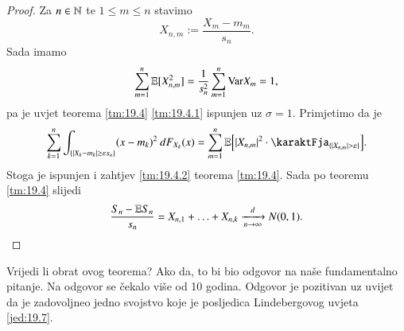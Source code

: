 \begin{proof}
    Za $n \in \mathbb{N}$ te $1 \leq m \leq n$ stavimo
    \begin{equation*}
        X_{n, m} := \frac{X_m - m_m}{s_n}.
    \end{equation*}
    Sada imamo
    \begin{equation*}
        \sum\limits_{m = 1}^{n} \mathbb{E} [X_{n, m}^2] = \frac{1}{s_n^2} \sum\limits_{m = 1}^{n} \mathrm{Var} X_m = 1,
    \end{equation*}
    pa je uvjet teorema \ref{tm:19.4} \ref{tm:19.4.1} ispunjen uz $\sigma = 1$.
    Primjetimo da je
    \begin{equation*}
        \suma{k = 1}{n} \int_{\{|X_k - m_k| \geq \varepsilon s_n\}} (x - m_k)^2 \: d F_{X_k} (x) = \suma{m = 1}{n} \masE \Big[ |X_{n, m}|^2 \cdot \karaktFja_{\{ |X_{n, m}| > \varepsilon \}} \Big].
    \end{equation*}
    Stoga je ispunjen i zahtjev \ref{tm:19.4.2} teorema \ref{tm:19.4}.
    Sada po teoremu \ref{tm:19.4} slijedi
    \begin{equation*}
        \frac{S_n - \mathbb{E} S_n}{s_n} = X_{n, 1} + \ldots + X_{n, k} \xrightarrow[n \to \infty]{d} N(0, 1).
    \end{equation*}
\end{proof}

Vrijedi li obrat ovog teorema?
Ako da, to bi bio odgovor na na\v se fundamentalno pitanje.
Na odgovor se \v cekalo vi\v se od 10 godina.
Odgovor je pozitivan uz uvijet da je zadovoljneo jedno svojstvo koje je posljedica Lindebergovog uvjeta \eqref{jed:19.7}.

